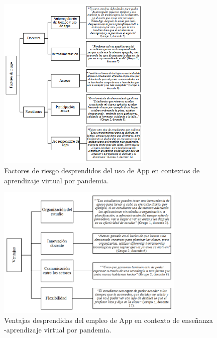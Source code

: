 \documentclass[spanish]{textolivre}
\begin{document}
\begin{figure}[htbp]
 \centering
 \includegraphics[width=0.65\textwidth]{fig33b.png}
 \caption{Factores de riesgo desprendidos del uso de App en contextos de aprendizaje virtual por pandemia.}
 \label{fig33b}
\end{figure}

\begin{figure}[htbp]
 \centering
 \includegraphics[width=0.8\textwidth]{fig33c.png}
 \caption{Ventajas desprendidas del empleo de App en contexto de enseñanza -aprendizaje virtual por pandemia.}
 \label{fig33c}
\end{figure}
\end{document}
